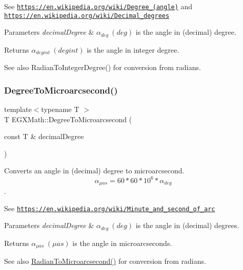 See \href{https://en.wikipedia.org/wiki/Degree_(angle)}{\tt https\+://en.\+wikipedia.\+org/wiki/\+Degree\+\_\+(angle)} and \href{https://en.wikipedia.org/wiki/Decimal_degrees}{\tt https\+://en.\+wikipedia.\+org/wiki/\+Decimal\+\_\+degrees} 
\begin{DoxyParams}{Parameters}
{\em decimal\+Degree} & $\alpha_{deg}\ (deg)$ is the angle in (decimal) degree. \\
\hline
\end{DoxyParams}
\begin{DoxyReturn}{Returns}
$\alpha_{deg int}\ (deg int)$ is the angle in integer degree. 
\end{DoxyReturn}
\begin{DoxySeeAlso}{See also}
Radian\+To\+Integer\+Degree() for conversion from radians. 
\end{DoxySeeAlso}
\mbox{\label{group___e_g_x_math-_angle_conversions-_degree_ga31b65388fe1b4656663b3d66b9d764e6}} 
\subsubsection{\texorpdfstring{Degree\+To\+Microarcsecond()}{DegreeToMicroarcsecond()}}
{\footnotesize\ttfamily template$<$typename T $>$ \\
T E\+G\+X\+Math\+::\+Degree\+To\+Microarcsecond (\begin{DoxyParamCaption}\item[{const T \&}]{decimal\+Degree }\end{DoxyParamCaption})}



Converts an angle in (decimal) degree to microarcsecond. \[\alpha_{\mu as}=60 * 60 * 10^6 * \alpha_{deg}\]. 

See \href{https://en.wikipedia.org/wiki/Minute_and_second_of_arc}{\tt https\+://en.\+wikipedia.\+org/wiki/\+Minute\+\_\+and\+\_\+second\+\_\+of\+\_\+arc} 
\begin{DoxyParams}{Parameters}
{\em decimal\+Degree} & $\alpha_{deg}\ (deg)$ is the angle in (decimal) degrees. \\
\hline
\end{DoxyParams}
\begin{DoxyReturn}{Returns}
$\alpha_{\mu as}\ (\mu as)$ is the angle in microarcseconds. 
\end{DoxyReturn}
\begin{DoxySeeAlso}{See also}
\mbox{\hyperlink{group___e_g_x_math-_angle_conversions-_radian_ga3a515ca2838a305fa40750763f546a86}{Radian\+To\+Microarcsecond()}} for conversion from radians. 
\end{DoxySeeAlso}
\mbox{\label{group___e_g_x_math-_angle_conversions-_degree_ga2c218e286b2ef72a00734dbc5a7f5ab6}} 
